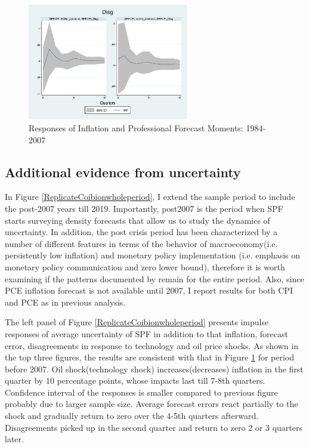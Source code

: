 \documentclass[]{article}
\begin{document}
\begin{figure}[ht]
		\includegraphics[width=7cm,totalheight=3cm]{figures/SPFDisg_ab_ashocks_before2007.png} 
		\caption{Responses of Inflation and Professional Forecast Moments: 1984-2007}
		\label{ReplicateCoibionBefore2007}
	\end{figure}
	
	
	\subsection{Additional evidence from uncertainty}
	
	In Figure \ref{ReplicateCoibionwholeperiod}, I extend the sample period to include the post-2007 years till 2019. Importantly, post2007 is the period when SPF starts surveying density forecasts that allow us to study the dynamics of uncertainty. In addition, the post crisis period has been characterized by a number of different features in terms of the behavior of macroeconomy(i.e. persistently low inflation) and monetary policy implementation (i.e. emphasis on monetary policy communication and zero lower bound), therefore it is worth examining if the patterns documented by \cite{coibion2012can} remain for the entire period. Also, since PCE inflation forecast is not available until 2007, I report results for both CPI and PCE as in previous analysis. 
	
	The left panel of  Figure \ref{ReplicateCoibionwholeperiod} presents impulse responses of average uncertainty of SPF in addition to that inflation, forecast error, disagreements in response to technology and oil price shocks. As shown in the top three figures, the results are consistent with that in Figure \ref{ReplicateCoibionBefore2007} for period before 2007.  Oil shock(technology shock) increases(decreases) inflation in the first quarter by 10 percentage  points, whose impacts last till 7-8th quarters. Confidence interval of the responses is smaller compared to previous figure probably due to larger sample size.  Average forecast errors react partially to the shock and gradually return to zero over the 4-5th quarters afterward. Disagreements picked up in the second quarter and return to zero 2 or 3 quarters  later. 
	
\end{document}
